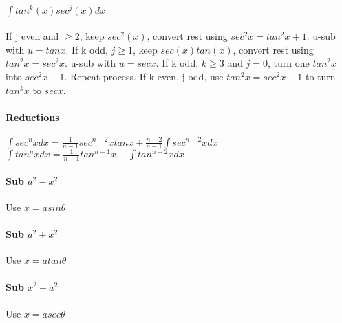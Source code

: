 \documentclass[10pt,landscape]{article}
\begin{document}
\begin{multicols}{4}
\paragraph{$ \int tan^k(x)sec^j(x)dx $}
If j even and $\ge 2$, keep $sec^2(x)$, convert rest using $sec^2x=tan^2x+1$. u-sub with $u=tanx$.
If k odd, $j \ge 1$, keep $sec(x)tan(x)$, convert rest using $tan^2x=sec^2x$. u-sub with $u=secx$.
If k odd, $k \ge 3$ and $j=0$, turn one $tan^2x$ into $sec^2x-1$. Repeat process.
If k even, j odd, use $tan^2x=sec^2x-1$ to turn $tan^kx$ to $secx$.

\paragraph{Reductions}
$ \int sec^nx dx = \frac{1}{n-1}sec^{n-2}xtanx+\frac{n-2}{n-1}\int sec^{n-2}x dx$
$ \int tan^nx dx = \frac{1}{n-1}tan^{n-1}x-\int tan^{n-2}x dx$

\paragraph{Sub $a^2-x^2$}
Use $x=asin\theta$
\paragraph{Sub $a^2+x^2$}
Use $x=atan\theta$
\paragraph{Sub $x^2-a^2$}
Use $x=asec\theta$
		
	\end{multicols}
\end{document}
